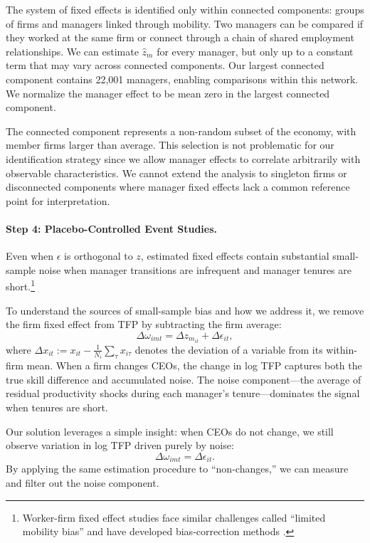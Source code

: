 \documentclass[11pt,a4paper]{article}
\begin{document}
The system of fixed effects is identified only within connected components: groups of firms and managers linked through mobility. Two managers can be compared if they worked at the same firm or connect through a chain of shared employment relationships. We can estimate $\hat z_m$ for every manager, but only up to a constant term that may vary across connected components. Our largest connected component contains 22,001 managers, enabling comparisons within this network. We normalize the manager effect to be mean zero in the largest connected component.

The connected component represents a non-random subset of the economy, with member firms larger than average. This selection is not problematic for our identification strategy since we allow manager effects to correlate arbitrarily with observable characteristics. We cannot extend the analysis to singleton firms or disconnected components where manager fixed effects lack a common reference point for interpretation.

\paragraph{Step 4: Placebo-Controlled Event Studies.} Even when $\epsilon$ is orthogonal to $z$, estimated fixed effects contain substantial small-sample noise when manager transitions are infrequent and manager tenures are short.\footnote{Worker-firm fixed effect studies face similar challenges called ``limited mobility bias'' \citep{andrews2008high} and have developed bias-correction methods \citep{Bonhomme2023-dx, gaure2014correlation}.}

To understand the sources of small-sample bias and how we address it, we remove the firm fixed effect from TFP by subtracting the firm average:
\begin{equation}
\Delta\omega_{imt} = \Delta z_{m_{it}} + \Delta\epsilon_{it},
\end{equation}
where $\Delta x_{it} := x_{it} - \frac{1}{N_i}\sum_{\tau} x_{i\tau}$ denotes the deviation of a variable from its within-firm mean. When a firm changes CEOs, the change in log TFP captures both the true skill difference and accumulated noise. The noise component---the average of residual productivity shocks during each manager's tenure---dominates the signal when tenures are short. 

Our solution leverages a simple insight: when CEOs do not change, we still observe variation in log TFP driven purely by noise:
\begin{equation}
\Delta\omega_{imt} = \Delta\epsilon_{it}.
\end{equation}
By applying the same estimation procedure to ``non-changes,'' we can measure and filter out the noise component.
\end{document}

